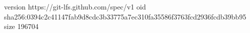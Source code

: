 version https://git-lfs.github.com/spec/v1
oid sha256:0394c2c41147fab9d8cdc3b33775a7ec310fa35586f3763fcd2936fcdb39bb95
size 196704
